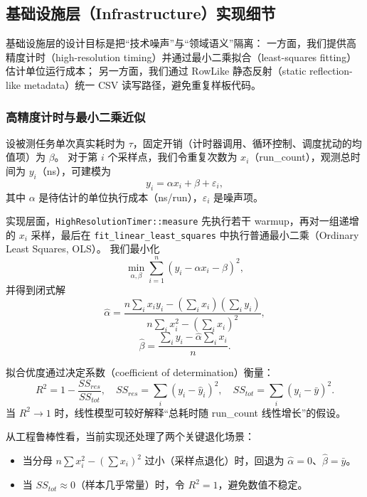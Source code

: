 \subsection{基础设施层（Infrastructure）实现细节}

基础设施层的设计目标是把“技术噪声”与“领域语义”隔离：
一方面，我们提供高精度计时（high-resolution timing）并通过最小二乘拟合（least-squares fitting）估计单位运行成本；
另一方面，我们通过 RowLike 静态反射（static reflection-like metadata）统一 CSV 读写路径，避免重复样板代码。

\subsubsection{高精度计时与最小二乘近似}

设被测任务单次真实耗时为 $\tau$，固定开销（计时器调用、循环控制、调度扰动的均值项）为 $\beta$。
对于第 $i$ 个采样点，我们令重复次数为 $x_i$（run\_count），观测总时间为 $y_i$（ns），可建模为
\begin{equation}
    y_i = \alpha x_i + \beta + \varepsilon_i,
\end{equation}
其中 $\alpha$ 是待估计的单位执行成本（ns/run），$\varepsilon_i$ 是噪声项。

实现层面，\texttt{HighResolutionTimer::measure} 先执行若干 warmup，再对一组递增的 $x_i$ 采样，最后在
\texttt{fit\_linear\_least\_squares} 中执行普通最小二乘（Ordinary Least Squares, OLS）。
我们最小化
\begin{equation}
    \min_{\alpha,\beta}\sum_{i=1}^{n}(y_i-\alpha x_i-\beta)^2,
\end{equation}
并得到闭式解
\begin{equation}
    \hat{\alpha}=\frac{n\sum_i x_i y_i-\left(\sum_i x_i\right)\left(\sum_i y_i\right)}
    {n\sum_i x_i^2-\left(\sum_i x_i\right)^2},
\end{equation}
\begin{equation}
    \hat{\beta}=\frac{\sum_i y_i-\hat{\alpha}\sum_i x_i}{n}.
\end{equation}

拟合优度通过决定系数（coefficient of determination）衡量：
\begin{equation}
    R^2 = 1-\frac{SS_{res}}{SS_{tot}},\quad
    SS_{res}=\sum_i(y_i-\hat{y}_i)^2,\quad
    SS_{tot}=\sum_i(y_i-\bar{y})^2.
\end{equation}
当 $R^2\to 1$ 时，线性模型可较好解释“总耗时随 run\_count 线性增长”的假设。

从工程鲁棒性看，当前实现还处理了两个关键退化场景：
\begin{itemize}
    \item 当分母 $n\sum x_i^2-(\sum x_i)^2$ 过小（采样点退化）时，回退为 $\hat{\alpha}=0$、$\hat{\beta}=\bar{y}$。
    \item 当 $SS_{tot}\approx 0$（样本几乎常量）时，令 $R^2=1$，避免数值不稳定。
\end{itemize}

